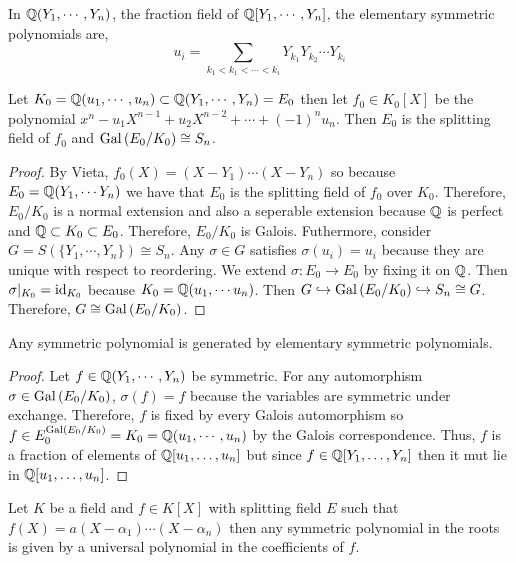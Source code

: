 \documentclass[12pt]{extarticle}
\begin{document}
\begin{definition}
In $\mathbb{Q}(Y_1, \cdots, Y_n)$, the fraction field of $\mathbb{Q}[Y_1, \cdots, Y_n]$, the elementary symmetric polynomials are, 
\[u_i = \sum_{k_1 < k_1 < \cdots < k_i} Y_{k_1} Y_{k_2} \cdots Y_{k_i}\]
\end{definition}


\begin{proposition}
Let $K_0 = \mathbb{Q}(u_1, \cdots, u_n) \subset \mathbb{Q}(Y_1, \cdots, Y_n) = E_0$ then let $f_0 \in K_0[X]$ be the polynomial $x^n - u_1 X^{n-1} + u_2 X^{n-2} + \cdots + (-1)^n u_n$. Then $E_0$ is the splitting field of $f_0$ and $\mathrm{Gal}\left( E_0/K_0 \right) \cong S_n$.
\end{proposition}

\begin{proof}
By Vieta, $f_0(X) = (X - Y_1) \cdots (X - Y_n)$ so because $E_0 = \mathbb{Q}(Y_1, \cdots Y_n)$ we have that $E_0$ is the splitting field of $f_0$ over $K_0$. Therefore, $E_0 / K_0$ is a normal extension and also a seperable extension because $\mathbb{Q}$ is perfect and $\mathbb{Q} \subset K_0 \subset E_0$. Therefore, $E_0/K_0$ is Galois. Futhermore, consider $G =  S(\{Y_1, \cdots, Y_n\}) \cong S_n$. Any $\sigma \in G$ satisfies $\sigma(u_i) = u_i$ because they are unique with respect to reordering. We extend $\sigma : E_0 \to E_0$ by fixing it on $\mathbb{Q}$. Then $\sigma|_{K_0} = \mathrm{id}_{K_0}$ because $K_0 = \mathbb{Q}(u_1, \cdots u_n)$. Then $G \hookrightarrow \mathrm{Gal}\left( E_0/K_0 \right) \hookrightarrow S_n \cong G$. Therefore, $G \cong \mathrm{Gal}\left( E_0/K_0 \right)$. 
\end{proof}

\begin{corollary}
Any symmetric polynomial is generated by elementary symmetric polynomials.
\end{corollary}

\begin{proof}
Let $f \in \mathbb{Q}(Y_1, \cdots, Y_n)$ be symmetric. For any automorphism $\sigma \in \mathrm{Gal}\left( E_0/K_0 \right)$, $\sigma(f) = f$ because the variables are symmetric under exchange. Therefore, $f$ is fixed by every Galois automorphism so $f \in E_0^{\mathrm{Gal}\left( E_0/K_0 \right)} = K_0 = \mathbb{Q}(u_1, \cdots, u_n)$ by the Galois correspondence. Thus, $f$ is a fraction of elements of $\mathbb{Q}[u_1, \dots, u_n]$ but since $f \in \mathbb{Q}[Y_1, \dots, Y_n]$ then it mut lie in $\mathbb{Q}[u_1, \dots, u_n]$. 
\end{proof}


\begin{corollary}
Let $K$ be a field and $f \in K[X]$ with splitting field $E$ such that $f(X) = a(X - \alpha_1) \cdots (X - \alpha_n)$ then any symmetric polynomial in the roots is given by a universal polynomial in the coefficients of $f$.  
\end{corollary}
\end{document}
